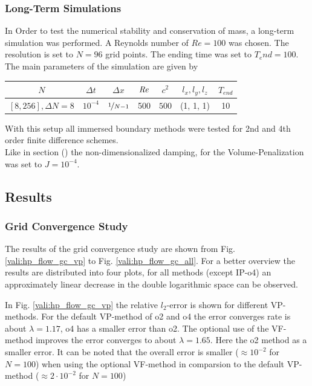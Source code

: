 \subsubsection{Long-Term Simulations}

In Order to test the  numerical stability and conservation of mass, a long-term simulation was performed.
A Reynolds number of $Re=100$ was chosen. The resolution is set to $N=96$ grid points.
The ending time was set to $T_end=100$.
The main parameters of the simulation are  given by

\begin{center}
\vspace*{0.7ex}
\begin{tabular}{c|c|c|c|c|c|c }
 $ N  $                   & $\Delta t$ & $\Delta x$            & $\mbox{\textit{Re}}$  & $c^2$   & $l_x, l_y, l_z$ & $T_{end}$\\
\hline
 $[8, 256], \Delta N = 8 $& $10^{-4}$ & $\nicefrac{1}{N - 1}$ & 500     & $500$   & (1, 1, 1)       & 10\\
\end{tabular}
\vspace*{0.7ex}
\end{center}

With this setup all immersed boundary methods were tested for 2nd and 4th order finite difference schemes.\\
Like in section () the non-dimensionalized damping, for the Volume-Penalization was set to $J=10^{-4}$.


\subsection{Results}

\subsubsection{Grid Convergence Study}

The results of the grid convergence study are shown from Fig. \ref{vali:hp_flow_gc_vp} to Fig. \ref{vali:hp_flow_gc_all}.
For a better overview the results are distributed into four plots,
for all methods (except IP-o4) an approximately linear decrease in the double logarithmic space can be observed.

In Fig. \ref{vali:hp_flow_gc_vp} the relative $l_2$-error is shown for different VP-methods.
For the default VP-method of o2 and o4 the error converges rate is about $\lambda=1.17$,
o4 has a smaller error than o2.
The optional use of the VF-method improves the error converges to about $\lambda=1.65$.
Here the o2 method as a smaller error.
It can be noted that the overall error is smaller ($\approx 10^{-2}$ for $N=100$)
when using the optional VF-method in comparsion to the default VP-method ($\approx2\cdot 10^{-2}$ for $N=100$)


